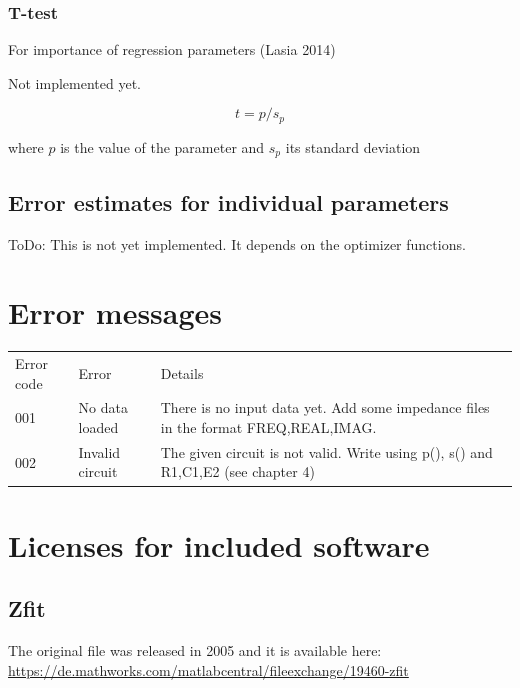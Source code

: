 \documentclass[9pt,a4paper,oneside]{book}
\begin{document}
\subsection{T-test}

For importance of regression parameters (Lasia 2014)

Not implemented yet.

\[ t = p/s_p \]

where $p$ is the value of the parameter and $s_p$ its standard deviation


\section{Error estimates for individual parameters}

ToDo: This is not yet implemented. It depends on the optimizer functions.

\chapter{Error messages}

\begin{tabular}{lll}
	Error code 	& Error & Details \\
	001			& No data loaded	& There is no input data yet. Add some impedance files in the format FREQ,REAL,IMAG. \\
	002			& Invalid circuit	& The given circuit is not valid. Write using p(), s() and R1,C1,E2 (see chapter 4)\\
\end{tabular}


\newpage{}
\chapter{Licenses for included software}

\section{Zfit}

The original file was released in 2005 and it is available here:\\

\url{https://de.mathworks.com/matlabcentral/fileexchange/19460-zfit}
\end{document}
